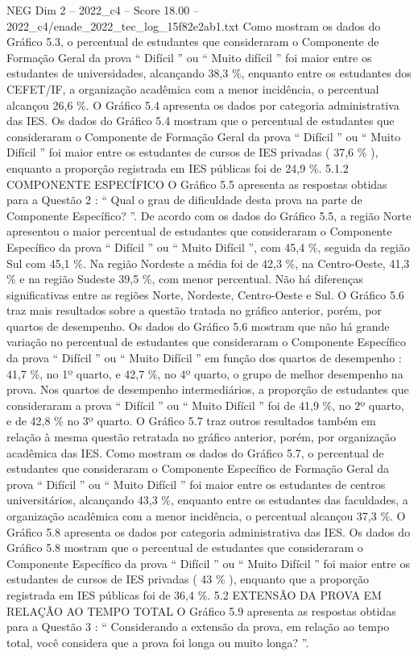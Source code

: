 \begin{textsample}{NEG Dim 2 – 2022\_c4 – Score 18.00 – 2022\_c4/enade\_2022\_tec\_log\_15f82e2ab1.txt}
Como mostram os dados do Gráfico 5.3, o percentual de estudantes que consideraram o Componente de Formação Geral da prova “ Difícil ” ou “ Muito difícil ” foi maior entre os estudantes de universidades, alcançando 38,3 \%, enquanto entre os estudantes dos CEFET/IF, a organização acadêmica com a menor incidência, o percentual alcançou 26,6 \%.
O Gráfico 5.4 apresenta os dados por categoria administrativa das IES.
Os dados do Gráfico 5.4 mostram que o percentual de estudantes que consideraram o Componente de Formação Geral da prova “ Difícil ” ou “ Muito Difícil ” foi maior entre os estudantes de cursos de IES privadas ( 37,6 \% ), enquanto a proporção registrada em IES públicas foi de 24,9 \%. 5.1.2 COMPONENTE ESPECÍFICO O Gráfico 5.5 apresenta as respostas obtidas para a Questão 2 : “ Qual o grau de dificuldade desta prova na parte de Componente Específico? ”.
De acordo com os dados do Gráfico 5.5, a região Norte apresentou o maior percentual de estudantes que consideraram o Componente Específico da prova “ Difícil ” ou “ Muito Difícil ”, com 45,4 \%, seguida da região Sul com 45,1 \%.
Na região Nordeste a média foi de 42,3 \%, na Centro-Oeste, 41,3 \% e na região Sudeste 39,5 \%, com menor percentual.
Não há diferenças significativas entre as regiões Norte, Nordeste, Centro-Oeste e Sul.
O Gráfico 5.6 traz mais resultados sobre a questão tratada no gráfico anterior, porém, por quartos de desempenho.
Os dados do Gráfico 5.6 mostram que não há grande variação no percentual de estudantes que consideraram o Componente Específico da prova “ Difícil ” ou “ Muito Difícil ” em função dos quartos de desempenho : 41,7 \%, no 1º quarto, e 42,7 \%, no 4º quarto, o grupo de melhor desempenho na prova.
Nos quartos de desempenho intermediários, a proporção de estudantes que consideraram a prova “ Difícil ” ou “ Muito Difícil ” foi de 41,9 \%, no 2º quarto, e de 42,8 \% no 3º quarto.
O Gráfico 5.7 traz outros resultados também em relação à mesma questão retratada no gráfico anterior, porém, por organização acadêmica das IES.
Como mostram os dados do Gráfico 5.7, o percentual de estudantes que consideraram o Componente Específico de Formação Geral da prova “ Difícil ” ou “ Muito Difícil ” foi maior entre os estudantes de centros universitários, alcançando 43,3 \%, enquanto entre os estudantes das faculdades, a organização acadêmica com a menor incidência, o percentual alcançou 37,3 \%.
O Gráfico 5.8 apresenta os dados por categoria administrativa das IES.
Os dados do Gráfico 5.8 mostram que o percentual de estudantes que consideraram o Componente Específico da prova “ Difícil ” ou “ Muito Difícil ” foi maior entre os estudantes de cursos de IES privadas ( 43 \% ), enquanto que a proporção registrada em IES públicas foi de 36,4 \%. 5.2 EXTENSÃO DA PROVA EM RELAÇÃO AO TEMPO TOTAL O Gráfico 5.9 apresenta as respostas obtidas para a Questão 3 : “ Considerando a extensão da prova, em relação ao tempo total, você considera que a prova foi longa ou muito longa? ”.

\end{textsample}
